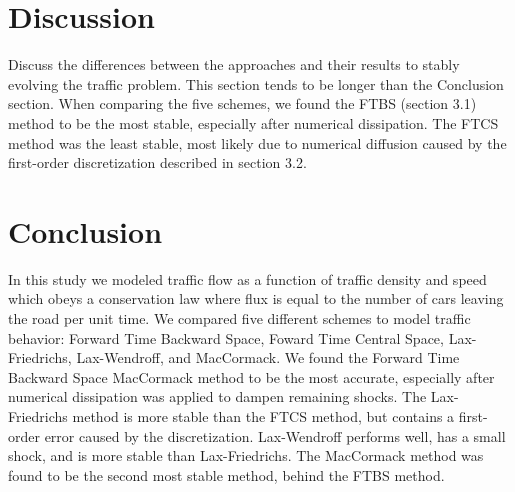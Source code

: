 \documentclass{article}
\begin{document}
\section{Discussion}
Discuss the differences between the approaches and their results to stably evolving the traffic problem. This section tends to be longer than the Conclusion section. 
When comparing the five schemes, we found the FTBS (section 3.1) method to be the most stable, especially after numerical dissipation. The FTCS method was the least stable, most likely due to numerical diffusion caused by the first-order discretization described in section 3.2.

\section{Conclusion}
In this study we modeled traffic flow as a function of traffic density and speed which obeys a conservation law where flux is equal to the number of cars leaving the road per unit time. We compared five different schemes to model traffic behavior: Forward Time Backward Space, Foward Time Central Space, Lax-Friedrichs, Lax-Wendroff, and MacCormack. We found the Forward Time Backward Space MacCormack method to be the most accurate, especially after numerical dissipation was applied to dampen remaining shocks. The Lax-Friedrichs method is more stable than the FTCS method, but contains a first-order error caused by the discretization. Lax-Wendroff performs well, has a small shock, and is more stable than Lax-Friedrichs. The MacCormack method was found to be the second most stable method, behind the FTBS method. 




\end{document}
